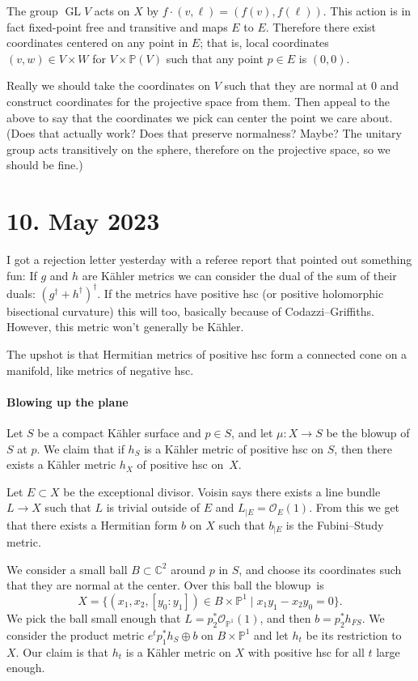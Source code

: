 \documentclass[11pt]{article}
\theoremstyle{definition}
\newcommand{\kk}[1]{\mathbb{#1}}
\newcommand{\cc}[1]{\mathcal{#1}}
\DeclareMathOperator{\GL}{GL}
\begin{document}
The group $\GL V$ acts on $X$ by $f \cdot (v, \ell) = (f(v), f(\ell))$.
This action is in fact fixed-point free and transitive and maps $E$ to $E$.
Therefore there exist coordinates centered on any point in $E$; that is,
local coordinates $(v,w) \in V \times W$ for $V \times \kk P(V)$ such that any
point $p \in E$ is $(0,0)$.

Really we should take the coordinates on $V$ such that they are normal at $0$
and construct coordinates for the projective space from them.
Then appeal to the above to say that the coordinates we pick can center the
point we care about.
(Does that actually work? Does that preserve normalness?
Maybe? The unitary group acts transitively on the sphere, therefore on the
projective space, so we should be fine.)



\section{10. May 2023}

I got a rejection letter yesterday with a referee report that pointed out
something fun: If $g$ and $h$ are K\"ahler metrics we can consider the dual of
the sum of their duals: $(g^\dagger + h^\dagger)^\dagger$.
If the metrics have positive hsc (or positive holomorphic bisectional curvature)
this will too, basically because of Codazzi--Griffiths.
However, this metric won't generally be K\"ahler.

The upshot is that Hermitian metrics of positive hsc form a connected cone on a
manifold, like metrics of negative hsc.

\paragraph{Blowing up the plane}

Let $S$ be a compact K\"ahler surface and $p \in S$,
and let $\mu : X \to S$ be the blowup of $S$ at $p$.
We claim that if $h_S$ is a K\"ahler metric of positive hsc on $S$,
then there exists a K\"ahler metric $h_X$ of positive hsc on~$X$.

Let $E \subset X$ be the exceptional divisor.
Voisin says there exists a line bundle $L \to X$ such that $L$ is trivial outside
of $E$ and $L_{|E} = \cc O_E(1)$.
From this we get that there exists a Hermitian form $b$ on $X$ such that
$b_{|E}$ is the Fubini--Study metric.

We consider a small ball $B \subset \kk C^2$ around $p$ in $S$,
and choose its coordinates such that they are normal at the center.
Over this ball the blowup~is%
$$
X = \{ (x_1, x_2, [y_0: y_1]) \in B \times \kk P^1
\mid x_1 y_1 - x_2 y_0 = 0 \}.
$$
We pick the ball small enough that $L = p_2^*\cc O_{\kk P^1}(1)$,
and then $b = p_2^* h_{FS}$.
We consider the product metric $e^t p_1^*h_S \oplus b$ on $B \times \kk P^1$
and let $h_t$ be its restriction to $X$.
Our claim is that $h_t$ is a K\"ahler metric on $X$ with positive hsc for all
$t$ large enough.
\end{document}
